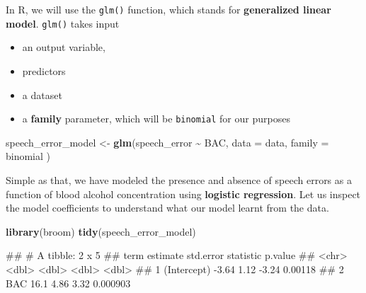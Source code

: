 \documentclass[
]{book}
\newenvironment{Shaded}{\begin{snugshade}}{\end{snugshade}}
\newcommand{\AttributeTok}[1]{\textcolor[rgb]{0.13,0.29,0.53}{#1}}
\newcommand{\FunctionTok}[1]{\textcolor[rgb]{0.13,0.29,0.53}{\textbf{#1}}}
\newcommand{\NormalTok}[1]{#1}
\newcommand{\OtherTok}[1]{\textcolor[rgb]{0.56,0.35,0.01}{#1}}
\newcommand{\SpecialCharTok}[1]{\textcolor[rgb]{0.81,0.36,0.00}{\textbf{#1}}}
\newcommand{\StringTok}[1]{\textcolor[rgb]{0.31,0.60,0.02}{#1}}
\providecommand{\tightlist}{%
  \setlength{\itemsep}{0pt}\setlength{\parskip}{0pt}}
\begin{document}
In R, we will use the \texttt{glm()} function, which stands for \textbf{generalized linear model}. \texttt{glm()} takes input

\begin{itemize}
\tightlist
\item
  an output variable,
\item
  predictors
\item
  a dataset
\item
  a \textbf{family} parameter, which will be \texttt{\textquotesingle{}binomial\textquotesingle{}} for our purposes
\end{itemize}

\begin{Shaded}
\begin{Highlighting}[]
\NormalTok{speech\_error\_model }\OtherTok{\textless{}{-}} \FunctionTok{glm}\NormalTok{(speech\_error }\SpecialCharTok{\textasciitilde{}}\NormalTok{ BAC, }\AttributeTok{data =}\NormalTok{ data,}
                          \AttributeTok{family =} \StringTok{\textquotesingle{}binomial\textquotesingle{}}
\NormalTok{                          )}
\end{Highlighting}
\end{Shaded}

Simple as that, we have modeled the presence and absence of speech errors as a function of blood alcohol concentration using \textbf{logistic regression}. Let us inspect the model coefficients to understand what our model learnt from the data.

\begin{Shaded}
\begin{Highlighting}[]
\FunctionTok{library}\NormalTok{(broom)}
\FunctionTok{tidy}\NormalTok{(speech\_error\_model)}
\end{Highlighting}
\end{Shaded}

\begin{Shaded}
\begin{Highlighting}[]
\NormalTok{\#\# \# A tibble: 2 x 5}
\NormalTok{\#\#   term        estimate std.error statistic  p.value}
\NormalTok{\#\#   \textless{}chr\textgreater{}          \textless{}dbl\textgreater{}     \textless{}dbl\textgreater{}     \textless{}dbl\textgreater{}    \textless{}dbl\textgreater{}}
\NormalTok{\#\# 1 (Intercept)    {-}3.64      1.12     {-}3.24 0.00118 }
\NormalTok{\#\# 2 BAC            16.1       4.86      3.32 0.000903}
\end{Highlighting}
\end{Shaded}
\end{document}
